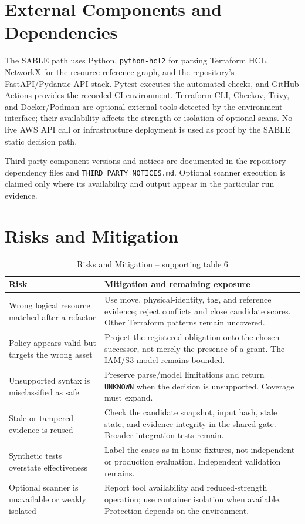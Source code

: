 \section{External Components and Dependencies}

The SABLE path uses Python, \texttt{python-hcl2} for parsing Terraform HCL, NetworkX for the resource-reference graph, and the repository's FastAPI/Pydantic API stack. Pytest executes the automated checks, and GitHub Actions provides the recorded CI environment. Terraform CLI, Checkov, Trivy, and Docker/Podman are optional external tools detected by the environment interface; their availability affects the strength or isolation of optional scans. No live AWS API call or infrastructure deployment is used as proof by the SABLE static decision path.

Third-party component versions and notices are documented in the repository dependency files and \texttt{THIRD\_PARTY\_NOTICES.md}. Optional scanner execution is claimed only where its availability and output appear in the particular run evidence.

\section{Risks and Mitigation}

\begin{longtable}{p{}p{}}
\caption{Risks and Mitigation -- supporting table 6}\\
\toprule
\textbf{Risk} & \textbf{Mitigation and remaining exposure}\\
\midrule
Wrong logical resource matched after a refactor & Use move, physical-identity, tag, and reference evidence; reject conflicts and close candidate scores. Other Terraform patterns remain uncovered.\\
Policy appears valid but targets the wrong asset & Project the registered obligation onto the chosen successor, not merely the presence of a grant. The IAM/S3 model remains bounded.\\
Unsupported syntax is misclassified as safe & Preserve parse/model limitations and return \texttt{UNKNOWN} when the decision is unsupported. Coverage must expand.\\
Stale or tampered evidence is reused & Check the candidate snapshot, input hash, stale state, and evidence integrity in the shared gate. Broader integration tests remain.\\
Synthetic tests overstate effectiveness & Label the cases as in-house fixtures, not independent or production evaluation. Independent validation remains.\\
Optional scanner is unavailable or weakly isolated & Report tool availability and reduced-strength operation; use container isolation when available. Protection depends on the environment.\\
\bottomrule
\end{longtable}

